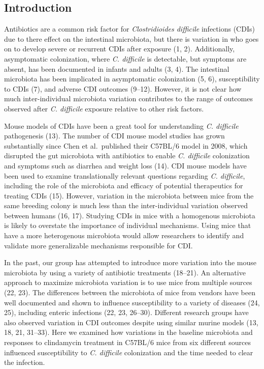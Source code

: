 \documentclass[
  11pt,
]{article}
\begin{document}
\newpage

\hypertarget{introduction}{%
\subsection{Introduction}\label{introduction}}

Antibiotics are a common risk factor for \emph{Clostridioides difficile}
infections (CDIs) due to there effect on the intestinal microbiota, but
there is variation in who goes on to develop severe or recurrent CDIs
after exposure (1, 2). Additionally, asymptomatic colonization, where
\emph{C. difficile} is detectable, but symptoms are absent, has been
documented in infants and adults (3, 4). The intestinal microbiota has
been implicated in asymptomatic colonization (5, 6), susceptibility to
CDIs (7), and adverse CDI outcomes (9--12). However, it is not clear how
much inter-individual microbiota variation contributes to the range of
outcomes observed after \emph{C. difficile} exposure relative to other
risk factors.

Mouse models of CDIs have been a great tool for understanding \emph{C.
difficile} pathogenesis (13). The number of CDI mouse model studies has
grown substantially since Chen et al.~published their C57BL/6 model in
2008, which disrupted the gut microbiota with antibiotics to enable
\emph{C. difficile} colonization and symptoms such as diarrhea and
weight loss (14). CDI mouse models have been used to examine
translationally relevant questions regarding \emph{C. difficile},
including the role of the microbiota and efficacy of potential
therapeutics for treating CDIs (15). However, variation in the
microbiota between mice from the same breeding colony is much less than
the inter-individual variation observed between humans (16, 17).
Studying CDIs in mice with a homogenous microbiota is likely to
overstate the importance of individual mechanisms. Using mice that have
a more heterogenous microbiota would allow researchers to identify and
validate more generalizable mechanisms responsible for CDI.

In the past, our group has attempted to introduce more variation into
the mouse microbiota by using a variety of antibiotic treatments
(18--21). An alternative approach to maximize microbiota variation is to
use mice from multiple sources (22, 23). The differences between the
microbiota of mice from vendors have been well documented and shown to
influence susceptibility to a variety of diseases (24, 25), including
enteric infections (22, 23, 26--30). Different research groups have also
observed variation in CDI outcomes despite using similar murine models
(13, 18, 21, 31--33). Here we examined how variations in the baseline
microbiota and responses to clindamycin treatment in C57BL/6 mice from
six different sources influenced susceptibility to \emph{C. difficile}
colonization and the time needed to clear the infection.
\end{document}
